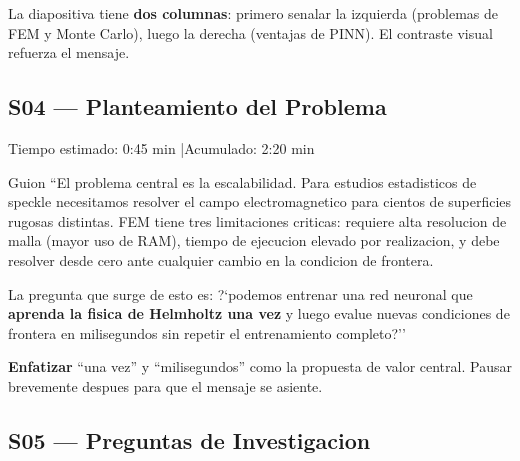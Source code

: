 \begin{tipbox}
La diapositiva tiene \textbf{dos columnas}: primero senalar la izquierda (problemas de FEM
y Monte Carlo), luego la derecha (ventajas de PINN). El contraste visual refuerza el
mensaje.
\end{tipbox}

\vspace{8pt}

\subsection{S04 --- Planteamiento del Problema}

\begin{timebox}
Tiempo estimado: 0:45 min \quad|\quad Acumulado: 2:20 min
\end{timebox}
\vspace{4pt}

\begin{slidebox}{Guion}
``El problema central es la escalabilidad. Para estudios estadisticos de speckle
necesitamos resolver el campo electromagnetico para cientos de superficies rugosas
distintas. FEM tiene tres limitaciones criticas: requiere alta resolucion de malla
(mayor uso de RAM), tiempo de ejecucion elevado por realizacion, y debe resolver
desde cero ante cualquier cambio en la condicion de frontera.

La pregunta que surge de esto es: ?`podemos entrenar una red neuronal que
\textbf{aprenda la fisica de Helmholtz una vez} y luego evalue nuevas condiciones
de frontera en milisegundos sin repetir el entrenamiento completo?''
\end{slidebox}
\vspace{4pt}

\begin{tipbox}
\textbf{Enfatizar} ``una vez'' y ``milisegundos'' como la propuesta de valor central.
Pausar brevemente despues para que el mensaje se asiente.
\end{tipbox}

\vspace{8pt}

\subsection{S05 --- Preguntas de Investigacion}

